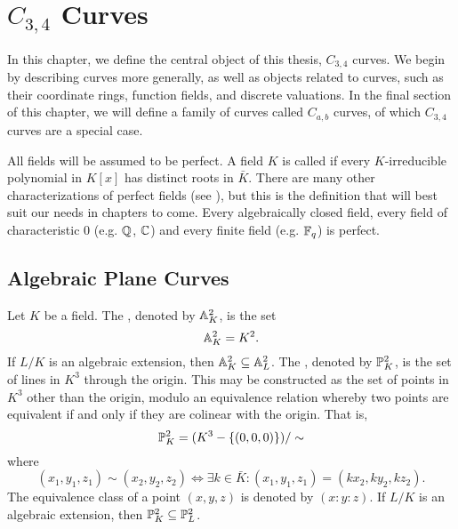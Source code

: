 
\section{$C_{3,4}$ Curves}
\label{chap_curves}

In this chapter, we define the central object of this thesis, $C_{3,4}$ curves.
We begin by describing curves more generally, as well as objects related to curves,
such as their coordinate rings, function fields, and discrete valuations.
In the final section of this chapter, we will define a family of curves called $C_{a,b}$ curves,
of which $C_{3,4}$ curves are a special case.

All fields will be assumed to be perfect.
A field $K$ is called  if every $K$-irreducible polynomial in $K[x]$
has distinct roots in $\bar K$.
There are many other characterizations of perfect fields (see \cite{hungerford}),
but this is the definition that will best suit our needs in chapters to come.
Every algebraically closed field,
every field of characteristic 0 (e.g. $\mathbb{Q}$, $\mathbb{C}$)
and every finite field (e.g. $\mathbb{F}_q$) is perfect.




\subsection{Algebraic Plane Curves}
\label{sec_plane_curves}

Let $K$ be a field.
The , denoted by $\mathbb{A}_K^2$, is the set
\[ \mathbb{A}_K^2 = K^2. \]
If $L/K$ is an algebraic extension, then $\mathbb{A}_K^2 \subseteq \mathbb{A}_L^2$.
The , denoted by $\mathbb{P}_K^2$, is the set of lines in $K^3$ through the origin.
This may be constructed as the set of points in $K^3$ other than the origin,
modulo an equivalence relation whereby two points are equivalent
if and only if they are colinear with the origin. That is,
\[ \mathbb{P}_K^2 = (K^3 - \{(0,0,0)\})/\sim \]
where
\begin{equation}
  \label{eq_projective_point_relation}
  (x_1, y_1, z_1) \sim (x_2, y_2, z_2) \iff \exists k \in \bar K : (x_1, y_1, z_1) = (kx_2, ky_2, kz_2).
\end{equation}
The equivalence class of a point $(x, y, z)$ is denoted by $(x : y : z)$.
If $L/K$ is an algebraic extension, then $\mathbb{P}_K^2 \subseteq \mathbb{P}_L^2$.

